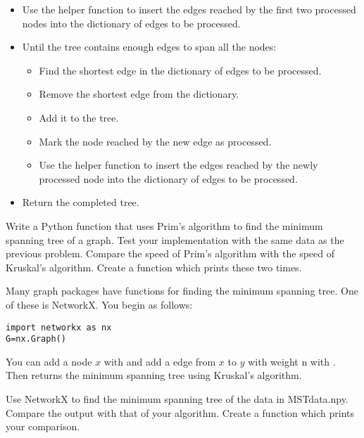 \begin{itemize}
\begin{itemize}
	\end{itemize}

\item Use the helper function to insert the edges reached by the first two processed nodes into the dictionary of edges to be processed.

\item Until the tree contains enough edges to span all the nodes:

	\begin{itemize}

	\item Find the shortest edge in the dictionary of edges to be processed.

	\item Remove the shortest edge from the dictionary.

	\item Add it to the tree.

	\item Mark the node reached by the new edge as processed.

	\item Use the helper function to insert the edges reached by the newly processed node into the dictionary of edges to be processed.

	\end{itemize}

\item Return the completed tree.

\end{itemize}

\begin{problem}
Write a Python function that uses Prim's algorithm to find the minimum spanning tree of a graph.
Test your implementation with the same data as the previous problem.
Compare the speed of Prim's algorithm with the speed of Kruskal's algorithm.
Create a function which prints these two times.
\end{problem}

Many graph packages have functions for finding the minimum spanning tree. One of these is NetworkX. You begin as follows:
\begin{lstlisting}
import networkx as nx
G=nx.Graph()
\end{lstlisting}
You can add a node $x$ with  and add a edge from $x$ to $y$ with weight n with . Then  returns the minimum spanning tree using Kruskal's algorithm.

\begin{problem}
Use NetworkX to find the minimum spanning tree of the data in MSTdata.npy.
Compare the output with that of your algorithm.
Create a function which prints your comparison.
\end{problem}

